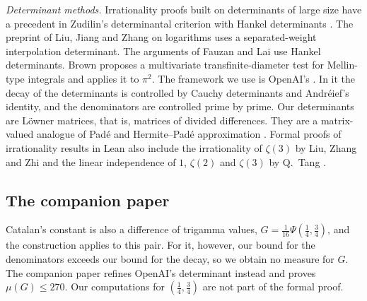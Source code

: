 \documentclass[11pt]{amsart}
\theoremstyle{definition}
\theoremstyle{remark}
\numberwithin{equation}{section}
\begin{document}
\emph{Determinant methods.} Irrationality proofs built on determinants of large size have a precedent in Zudilin's
determinantal criterion with Hankel determinants \cite{Zudilin}. The preprint of Liu, Jiang and Zhang on logarithms
\cite{LiuJiangZhang26} uses a separated-weight interpolation determinant. The arguments of Fauzan and Lai
\cite{Fauzan2026,Lai2026} use Hankel determinants. Brown \cite{Brown26} proposes a multivariate
transfinite-diameter test for Mellin-type integrals and applies it to $\pi^2$. The framework we use is OpenAI's
\cite{OpenAI2026}. In it the decay of the determinants is controlled by Cauchy determinants and Andr\'eief's identity,
and the denominators are controlled prime by prime. Our determinants are L\"owner matrices, that is, matrices of
divided differences. They are a matrix-valued analogue of Pad\'e and Hermite--Pad\'e approximation
\cite{NikishinSorokin91}. Formal proofs of irrationality results in Lean also include the irrationality of $\zeta(3)$ by
Liu, Zhang and Zhi \cite{LZZ25} and the linear independence of $1$, $\zeta(2)$ and $\zeta(3)$ by Q.~Tang
\cite{Tang26}.

\subsection{The companion paper}
Catalan's constant is also a difference of trigamma values, $G=\frac1{16}\Psi(\frac14,\frac34)$, and the construction
applies to this pair. For it, however, our bound for the denominators exceeds our bound for the decay, so we obtain no
measure for $G$. The companion paper \cite{Litsey2026} refines OpenAI's determinant instead and proves
$\mu(G)\le270$. Our computations for $(\frac14,\frac34)$ are not part of the formal proof.
\end{document}
